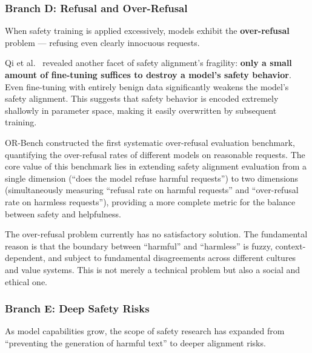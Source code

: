 \subsubsection{Branch D: Refusal and Over-Refusal}
\label{sec:t3-refusal}

When safety training is applied excessively, models exhibit the \textbf{over-refusal} problem ---
refusing even clearly innocuous requests.

Qi et al.\ \cite{qi2023finetuning} revealed another facet of safety alignment's fragility:
\textbf{only a small amount of fine-tuning suffices to destroy a model's safety behavior}.
Even fine-tuning with entirely benign data
significantly weakens the model's safety alignment.
This suggests that safety behavior is encoded extremely shallowly in parameter space,
making it easily overwritten by subsequent training.

OR-Bench \cite{cui2024orbench} constructed the first systematic over-refusal evaluation benchmark,
quantifying the over-refusal rates of different models on reasonable requests.
The core value of this benchmark lies in extending safety alignment evaluation from a single dimension
(``does the model refuse harmful requests'') to two dimensions
(simultaneously measuring ``refusal rate on harmful requests'' and ``over-refusal rate on harmless requests''),
providing a more complete metric for the balance between safety and helpfulness.

\begin{openproblembox}
The over-refusal problem currently has no satisfactory solution.
The fundamental reason is that the boundary between ``harmful'' and ``harmless'' is fuzzy, context-dependent,
and subject to fundamental disagreements across different cultures and value systems.
This is not merely a technical problem but also a social and ethical one.
\end{openproblembox}

\subsubsection{Branch E: Deep Safety Risks}
\label{sec:t3-deepsafety}

As model capabilities grow, the scope of safety research has expanded from ``preventing the generation of harmful text''
to deeper alignment risks.

